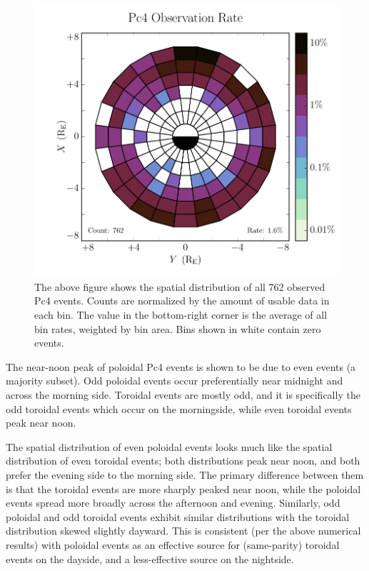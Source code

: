\documentclass[draft,linenumbers]{agujournal}
\begin{document}
\begin{figure}
    \begin{center}
    \includegraphics[width=\textwidth]{figures/fig_all.pdf}
    \caption{
        The above figure shows the spatial distribution of all 762 observed Pc4 events. Counts are normalized by the amount of usable data in each bin. The value in the bottom-right corner is the average of all bin rates, weighted by bin area. Bins shown in white contain zero events.
    }
    \label{fig_all}
    \end{center}
\end{figure}

The near-noon peak of poloidal Pc4 events is shown to be due to even events (a majority subset). Odd poloidal events occur preferentially near midnight and across the morning side. Toroidal events are mostly odd, and it is specifically the odd toroidal events which occur on the morningside, while even toroidal events peak near noon.

The spatial distribution of even poloidal events looks much like the spatial distribution of even toroidal events; both distributions peak near noon, and both prefer the evening side to the morning side. The primary difference between them is that the toroidal events are more sharply peaked near noon, while the poloidal events spread more broadly across the afternoon and evening. Similarly, odd poloidal and odd toroidal events exhibit similar distributions with the toroidal distribution skewed slightly dayward. This is consistent (per the above numerical results) with poloidal events as an effective source for (same-parity) toroidal events on the dayside, and a less-effective source on the nightside.
\end{document}
